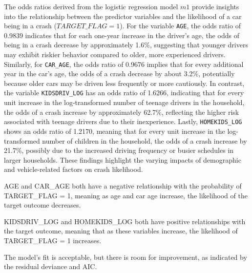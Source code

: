 \documentclass[
]{article}
\newenvironment{Shaded}{\begin{snugshade}}{\end{snugshade}}
\newcommand{\CommentTok}[1]{\textcolor[rgb]{0.56,0.35,0.01}{\textit{#1}}}
\newcommand{\DecValTok}[1]{\textcolor[rgb]{0.00,0.00,0.81}{#1}}
\newcommand{\FunctionTok}[1]{\textcolor[rgb]{0.13,0.29,0.53}{\textbf{#1}}}
\newcommand{\NormalTok}[1]{#1}
\newcommand{\OtherTok}[1]{\textcolor[rgb]{0.56,0.35,0.01}{#1}}
\newcommand{\SpecialCharTok}[1]{\textcolor[rgb]{0.81,0.36,0.00}{\textbf{#1}}}
\begin{document}
The odds ratios derived from the logistic regression model \(m1\)
provide insights into the relationship between the predictor variables
and the likelihood of a car being in a crash (\(TARGET\_FLAG = 1\)). For
the variable \texttt{AGE}, the odds ratio of 0.9839 indicates that for
each one-year increase in the driver's age, the odds of being in a crash
decrease by approximately 1.6\%, suggesting that younger drivers may
exhibit riskier behavior compared to older, more experienced drivers.
Similarly, for \texttt{CAR\_AGE}, the odds ratio of 0.9676 implies that
for every additional year in the car's age, the odds of a crash decrease
by about 3.2\%, potentially because older cars may be driven less
frequently or more cautiously. In contrast, the variable
\texttt{KIDSDRIV\_LOG} has an odds ratio of 1.6266, indicating that for
every unit increase in the log-transformed number of teenage drivers in
the household, the odds of a crash increase by approximately 62.7\%,
reflecting the higher risk associated with teenage drivers due to their
inexperience. Lastly, \texttt{HOMEKIDS\_LOG} shows an odds ratio of
1.2170, meaning that for every unit increase in the log-transformed
number of children in the household, the odds of a crash increase by
21.7\%, possibly due to the increased driving frequency or busier
schedules in larger households. These findings highlight the varying
impacts of demographic and vehicle-related factors on crash likelihood.

AGE and CAR\_AGE both have a negative relationship with the probability
of TARGET\_FLAG = 1, meaning as age and car age increase, the likelihood
of the target outcome decreases.

KIDSDRIV\_LOG and HOMEKIDS\_LOG both have positive relationships with
the target outcome, meaning that as these variables increase, the
likelihood of TARGET\_FLAG = 1 increases.

The model's fit is acceptable, but there is room for improvement, as
indicated by the residual deviance and AIC.

\begin{Shaded}
\end{Shaded}
\end{document}
